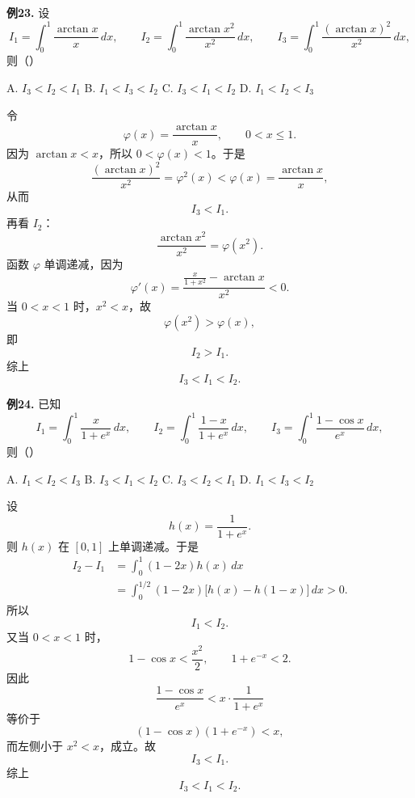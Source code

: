 \begin{problemblock}
\textbf{例23.} 设
\[
I_1=\int_0^1\frac{\arctan x}{x}\,dx,\qquad
I_2=\int_0^1\frac{\arctan x^2}{x^2}\,dx,\qquad
I_3=\int_0^1\frac{(\arctan x)^2}{x^2}\,dx,
\]
则（\quad）

A. \(I_3<I_2<I_1\)\qquad
B. \(I_1<I_3<I_2\)\qquad
C. \(I_3<I_1<I_2\)\qquad
D. \(I_1<I_2<I_3\)
\end{problemblock}
\begin{solutionblock}
令
\[
\varphi(x)=\frac{\arctan x}{x},\qquad 0<x\le1.
\]
因为 \(\arctan x<x\)，所以 \(0<\varphi(x)<1\)。于是
\[
\frac{(\arctan x)^2}{x^2}=\varphi^2(x)<\varphi(x)=\frac{\arctan x}{x},
\]
从而
\[
I_3<I_1.
\]
再看 \(I_2\)：
\[
\frac{\arctan x^2}{x^2}=\varphi(x^2).
\]
函数 \(\varphi\) 单调递减，因为
\[
\varphi'(x)=\frac{\frac{x}{1+x^2}-\arctan x}{x^2}<0.
\]
当 \(0<x<1\) 时，\(x^2<x\)，故
\[
\varphi(x^2)>\varphi(x),
\]
即
\[
I_2>I_1.
\]
综上
\[
I_3<I_1<I_2.
\]
\end{solutionblock}

\begin{problemblock}
\textbf{例24.} 已知
\[
I_1=\int_0^1\frac{x}{1+e^x}\,dx,\qquad
I_2=\int_0^1\frac{1-x}{1+e^x}\,dx,\qquad
I_3=\int_0^1\frac{1-\cos x}{e^x}\,dx,
\]
则（\quad）

A. \(I_1<I_2<I_3\)\qquad
B. \(I_3<I_1<I_2\)\qquad
C. \(I_3<I_2<I_1\)\qquad
D. \(I_1<I_3<I_2\)
\end{problemblock}
\begin{solutionblock}
设
\[
h(x)=\frac1{1+e^x}.
\]
则 \(h(x)\) 在 \([0,1]\) 上单调递减。于是
\[
\begin{aligned}
I_2-I_1
&=\int_0^1(1-2x)h(x)\,dx\\
&=\int_0^{1/2}(1-2x)\bigl[h(x)-h(1-x)\bigr]\,dx>0.
\end{aligned}
\]
所以
\[
I_1<I_2.
\]
又当 \(0<x<1\) 时，
\[
1-\cos x<\frac{x^2}{2},
\qquad 1+e^{-x}<2.
\]
因此
\[
\frac{1-\cos x}{e^x}
<x\cdot\frac1{1+e^x}
\]
等价于
\[
(1-\cos x)(1+e^{-x})<x,
\]
而左侧小于 \(x^2<x\)，成立。故
\[
I_3<I_1.
\]
综上
\[
I_3<I_1<I_2.
\]
\end{solutionblock}

